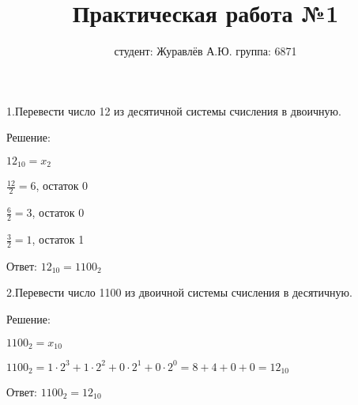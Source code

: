 \documentclass[a4paper,11pt]{article}
\title{Практическая работа №1}
\author{студент: Журавлёв А.Ю. группа: 6871}
\begin{document}
\maketitle
1.Перевести число 12 из десятичной системы счисления в двоичную.

Решение:

$12_{10}=x_2$

$\frac{12}{2}=6$, остаток 0

$\frac{6}{2}=3$, остаток 0

$\frac{3}{2}=1$, остаток 1

Ответ: $12_{10}=1100_2$

2.Перевести число 1100 из двоичной системы счисления в десятичную.

Решение:

$1100_2=x_{10}$

$1100_2=1\cdot2^3+1\cdot2^2+0\cdot2^1+0\cdot2^0=8+4+0+0=12_{10}$

Ответ: $1100_2=12_{10}$
\end{document}

